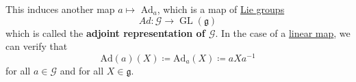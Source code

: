 \documentclass{article}
\DeclareMathOperator{\GL}{GL}
\newcounter{definition}[section]
\begin{document}
    \begin{definition}
      \label{def:the-adjoint-map-of-a-lie-group}
      This induces another map $a \mapsto$ Ad$_a$, which is a map of \hyperref[def:lie-group]{Lie groups}
      \begin{equation}
        Ad: \mathcal{G} \rightarrow \GL(\mathcal{\mathfrak{g}})
      \end{equation}
      which is called the \textbf{adjoint representation of $\mathcal{G}$}. In the case of a \hyperref[lin-def:linear_map]{linear map}, we can verify that 
      \begin{equation}
        \text{Ad}(a) (X) \coloneqq \text{Ad}_a (X) \coloneqq a X a^{-1}
      \end{equation}
      for all $a \in \mathcal{G}$ and for all $X \in \mathfrak{g}$. 
    \end{definition}
\end{document}
